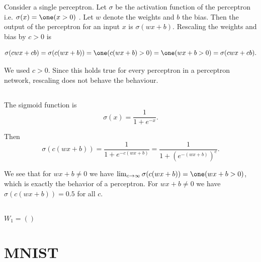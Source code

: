 \documentclass{article}
\begin{document}
\section{}
\section{}
\section{}
\section{}
\subsection{}
Consider a single perceptron. Let $\sigma$ be the activation function of the perceptron i.e. $\sigma(x)= \one (x >0)$ . Let $w$ denote the weights and $b$ the bias. Then the output of the perceptron for an input $x$ is $\sigma(w x +b)$. Rescaling the weights and bias by $c>0$ is 

$$\sigma(cw x +cb)=\sigma(c(w x +b))= \one (c(w x +b) >0)= \one (w x +b >0)=\sigma(cw x +cb).$$

We used $c>0$. Since this holds true for every perceptron in a perceptron network, rescaling does not behave the behaviour. 
\subsection{}
The sigmoid function is
$$\sigma(x)=\frac{1}{1+e^{-x}}.$$

Then 
$$\sigma(c(w x +b))=\frac{1}{1+e^{-c(w x +b)}}=\frac{1}{1+(e^{-(w x +b)})^c}.$$

We see that for $w x +b\neq 0$ we have $\lim_{c\to \infty}\sigma(c(w x +b))=\one (w x +b >0)$, which is exactly the behavior of a perceptron. For $w x +b\neq 0$ we have $\sigma(c(w x +b))=0.5$ for all $c$.
\subsection{}
$W_1 = ()$

\section{MNIST}
\end{document}
